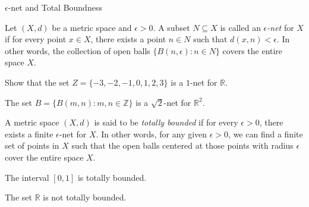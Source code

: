 \documentclass[12pt, a4paper]{article}
\begin{document}
\FrontPage
\Large

\begin{heading}
    $\epsilon$-net and Total Boundness
\end{heading}

\vspace{10pt}

\begin{definition}
    Let $(X, d)$ be a metric space and $\epsilon > 0$. A subset $N \subseteq X$ is called an \textit{$\epsilon$-net} for $X$ if for every point $x \in X$, there exists a point $n \in N$ such that $d(x, n) < \epsilon$. In other words, the collection of open balls $\{B(n, \epsilon) : n \in N\}$ covers the entire space $X$.
\end{definition}

\clearpage

\begin{problem}
    Show that the set $Z = \{-3, -2, -1, 0, 1, 2, 3\}$ is a $1$-net for $\mathbb{R}$.
\end{problem}

\vspace{200pt}

\begin{problem}
    The set $B=\{B(m, n) : m, n \in \mathbb{Z}\}$ is a $\sqrt{2}$-net for $\mathbb{R}^2$.
\end{problem}

\clearpage

\begin{definition}
    A metric space $(X, d)$ is said to be \textit{totally bounded} if for every $\epsilon > 0$, there exists a finite $\epsilon$-net for $X$. In other words, for any given $\epsilon > 0$, we can find a finite set of points in $X$ such that the open balls centered at those points with radius $\epsilon$ cover the entire space $X$.
\end{definition}

\vspace{300pt} 

\begin{problem}
    The interval $[0, 1]$ is totally bounded.
\end{problem}

\clearpage

\begin{problem}
    The set $\mathbb{R}$ is not totally bounded.
\end{problem}
\end{document}
